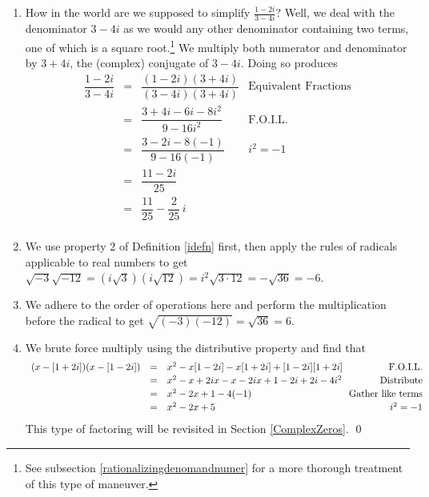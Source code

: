 \documentclass{ximera}
\begin{document}
\begin{ex}
\begin{enumerate}
\item  How in the world are we supposed to simplify $\frac{1-2i}{3-4i}$?  Well, we deal with the denominator $3-4i$ as we would any other denominator containing two terms, one of which is a square root.\footnote{See subsection \ref{rationalizingdenomandnumer} for a more thorough treatment of this type of maneuver.} We multiply both numerator and denominator by $3+4i$, the (complex) conjugate of $3 - 4i$.  Doing so produces\[\begin{array}{rclr}

 \dfrac{1-2i}{3-4i} & = & \dfrac{(1-2i)(3+4i)}{(3-4i)(3+4i)} & \text{Equivalent Fractions} \\[8pt]

                     & = &   \dfrac{3 + 4i - 6i - 8i^2}{9 - 16i^2} & \text{F.O.I.L.}\\[8pt]
										 & = & \dfrac{3 - 2i - 8(-1)}{9  - 16(-1)} & \text{$i^2 = -1$}\\[8pt]
						         & = &  \dfrac{11 - 2i}{25} & \\[8pt]
										  & = & \dfrac{11}{25} - \dfrac{2}{25} \, i & \\ \end{array}\]
										

\item  We use property 2 of Definition \ref{idefn} first, then apply the rules of radicals applicable to real numbers to get $\sqrt{-3} \sqrt{-12} = \left(i \sqrt{3}\right) \left(i \sqrt{12}\right) = i^2 \sqrt{3\cdot 12} = -\sqrt{36} = -6$.

\item  We adhere to the order of operations here and perform the multiplication before the radical to get  $\sqrt{(-3)(-12)} = \sqrt{36} = 6$. 

\item  We brute force multiply using the distributive property and find that \[\begin{array}{rclr} (x-[1+2i])(x-[1-2i]) & = &  x^2 -x[1-2i]-x[1+2i]+[1-2i][1+2i] & \text{F.O.I.L.}\\[2pt]

																					 &	= & x^2-x+2ix-x-2ix+1-2i+2i-4i^2 & \text{Distribute} \\ [2pt]
																					 &	= & x^2-2x + 1-4(-1)& \hspace*{-.05in}\text{Gather like terms}\\[2pt]
																					 & =  & x^2 -2x +5 & i^2=-1 \\ \end{array}\] This type of factoring will be revisited in Section \ref{ComplexZeros}. \qed

\end{enumerate}

\end{ex}
\end{document}
